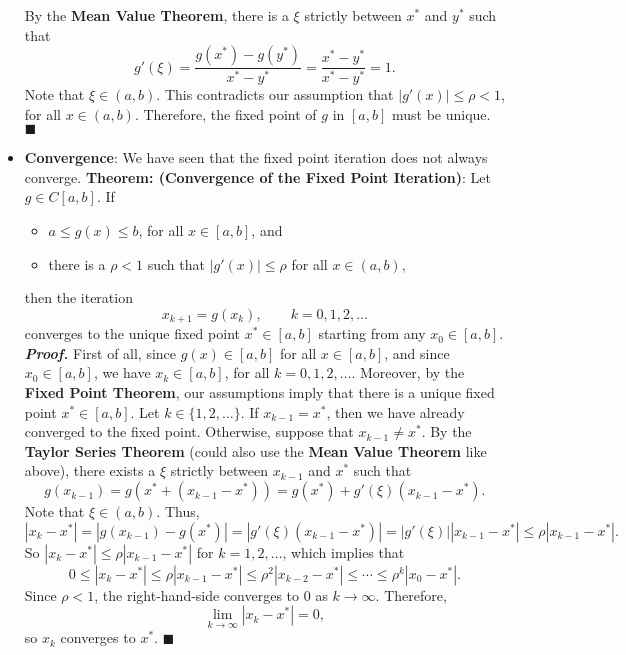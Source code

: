\documentclass{report}
\begin{document}
\begin{itemize}
    \bigbreak \noindent 
    By the \textbf{Mean Value Theorem}, there is a $\xi$ strictly between $x^*$ and $y^*$ such that
    $$  g'(\xi) = \frac{g(x^*) - g(y^*)}{x^* - y^*} = \frac{x^* - y^*}{x^* - y^*} = 1.$$
    Note that $\xi \in (a,b)$. This contradicts our assumption that $\left|g'(x)\right| \leq \rho < 1$, for all $x \in (a,b)$. Therefore, the fixed point of $g$ in $[a,b]$ must be unique. $\blacksquare$
\item \textbf{Convergence}: We have seen that the fixed point iteration does not always converge. 
    \bigbreak \noindent 
    \textbf{Theorem: (Convergence of the Fixed Point Iteration)}:
    Let $g \in C[a,b]$. If 
    \begin{itemize}
        \item$a \leq g(x) \leq b$, for all $x \in [a,b]$, and
        \item there is a $\rho < 1$ such that $\left|g'(x)\right| \leq \rho$ for all $x \in (a,b),$
    \end{itemize}
    then the iteration 
    $$x_{k+1} = g(x_{k}), \qquad k = 0, 1, 2, \ldots$$
    converges to the unique fixed point $x^* \in [a,b]$ starting from any $x_0 \in [a,b]$.
    \bigbreak \noindent 
    \textbf{\textit{Proof.}} First of all, since $g(x) \in [a,b]$ for all $x \in [a,b]$, and since $x_0 \in [a,b]$, we have $x_k \in [a,b]$, for all $k = 0, 1, 2, \ldots$. Moreover, by the \textbf{Fixed Point Theorem}, our assumptions imply that there is a unique fixed point $x^* \in [a,b]$. 
    \bigbreak \noindent 
    Let $k \in \{1,2,\ldots\}$. If $x_{k-1} = x^*$, then we have already converged to the fixed point. Otherwise, suppose that $x_{k-1} \neq x^*$. By the \textbf{Taylor Series Theorem} (could also use the \textbf{Mean Value Theorem} like above), there exists a $\xi$ strictly between $x_{k-1}$ and $x^*$ such that 
    $$ g(x_{k-1}) = g(x^* + (x_{k-1} - x^*)) = g(x^*) + g'(\xi) (x_{k-1} - x^*).$$
    Note that $\xi \in (a,b)$. Thus,
    $$ \left|x_k - x^*\right| = \left|g(x_{k-1}) - g(x^*)\right| = \left|g'(\xi)(x_{k-1} - x^*)\right| = \left|g'(\xi)\right|\left|x_{k-1} - x^*\right| \leq \rho \left|x_{k-1} - x^*\right|. $$
    So $\left|x_k - x^*\right| \leq \rho \left|x_{k-1} - x^*\right|$ for $k = 1, 2, \ldots$, which implies that
    $$ 0 \le \left|x_k - x^*\right| \leq \rho \left|x_{k-1} - x^*\right| \leq \rho^2 \left|x_{k-2} - x^*\right| \leq \cdots \leq \rho^k \left|x_{0} - x^*\right|.$$
    Since $\rho < 1$, the right-hand-side converges to $0$ as $k \to \infty$. Therefore,
    $$ \lim_{k \to \infty} \left|x_k - x^*\right| = 0,$$
    so $x_k$ converges to $x^*$. $\blacksquare$

\end{itemize}
\end{document}
